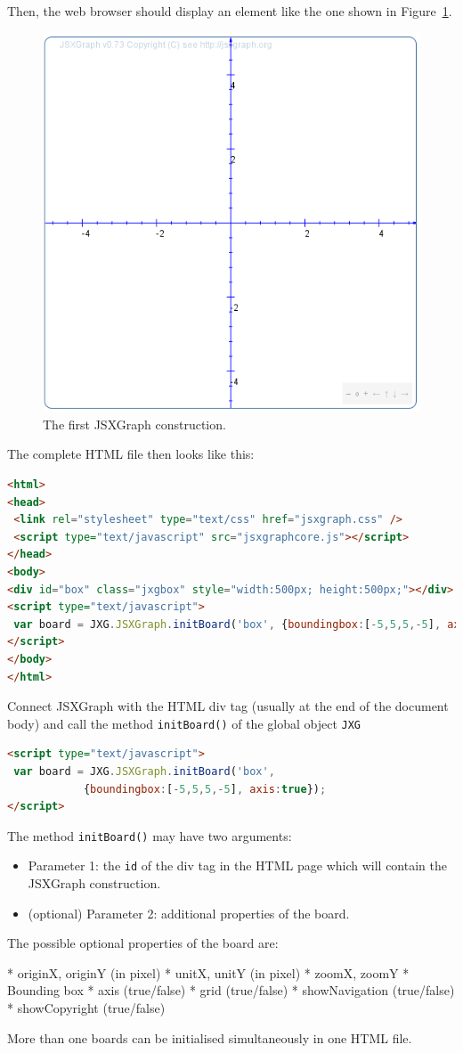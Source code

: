 Then, the web browser should display an element like the one shown in Figure~\ref{fig:1}.
\begin{figure}[htb]
\centerline{\includegraphics[width=0.4\linewidth]{images/b2.png}}
\caption{The first JSXGraph construction.}\label{fig:1}
\end{figure}

The complete HTML file then looks like this:
\begin{fullwidth}\begin{lstlisting}[language=HTML]
<html>
<head>
 <link rel="stylesheet" type="text/css" href="jsxgraph.css" />
 <script type="text/javascript" src="jsxgraphcore.js"></script>
</head>
<body>
<div id="box" class="jxgbox" style="width:500px; height:500px;"></div>
<script type="text/javascript">
 var board = JXG.JSXGraph.initBoard('box', {boundingbox:[-5,5,5,-5], axis:true});
</script>
</body>
</html>
\end{lstlisting}\end{fullwidth}
Connect JSXGraph with the HTML div tag (usually at the end of the document body) and call 
the method \lstinline|initBoard()| of the global object \lstinline|JXG|

\begin{lstlisting}[language=HTML]
<script type="text/javascript">
 var board = JXG.JSXGraph.initBoard('box', 
            {boundingbox:[-5,5,5,-5], axis:true});
</script>
\end{lstlisting}
The method \lstinline|initBoard()| may have two arguments:
\begin{itemize}
    \item Parameter 1: the \lstinline|id| of the div tag in the HTML page which will contain the JSXGraph construction.
    \item (optional) Parameter 2: additional properties of the board. 
\end{itemize}
The possible optional properties of the board are:

    * originX, originY (in pixel)
    * unitX, unitY (in pixel)
    * zoomX, zoomY
    * Bounding box
    * axis (true/false)
    * grid (true/false)
    * showNavigation (true/false)
    * showCopyright (true/false) 

More than one boards can be initialised simultaneously in one HTML file. 
